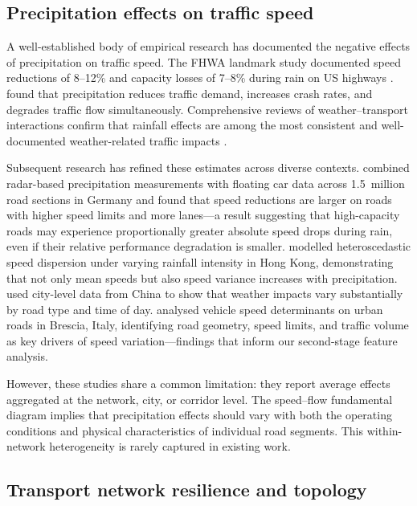 \documentclass[review]{elsarticle}
\begin{document}
\subsection{Precipitation effects on traffic speed}
\label{sec:lit:precip}

A well-established body of empirical research has documented the negative effects of precipitation on traffic speed. The FHWA landmark study documented speed reductions of 8--12\% and capacity losses of 7--8\% during rain on US highways \citep{hranac2006empirical}. \citet{maze2006weather} found that precipitation reduces traffic demand, increases crash rates, and degrades traffic flow simultaneously. Comprehensive reviews of weather--transport interactions confirm that rainfall effects are among the most consistent and well-documented weather-related traffic impacts \citep{koetse2009impact,elfaouzi2012effects}.

Subsequent research has refined these estimates across diverse contexts. \citet{becker2026rainfall} combined radar-based precipitation measurements with floating car data across 1.5~million road sections in Germany and found that speed reductions are larger on roads with higher speed limits and more lanes---a result suggesting that high-capacity roads may experience proportionally greater absolute speed drops during rain, even if their relative performance degradation is smaller. \citet{cai2016rainfall} modelled heteroscedastic speed dispersion under varying rainfall intensity in Hong Kong, demonstrating that not only mean speeds but also speed variance increases with precipitation. \citet{bi2022weather} used city-level data from China to show that weather impacts vary substantially by road type and time of day. \citet{raccagni2024urban} analysed vehicle speed determinants on urban roads in Brescia, Italy, identifying road geometry, speed limits, and traffic volume as key drivers of speed variation---findings that inform our second-stage feature analysis.

However, these studies share a common limitation: they report average effects aggregated at the network, city, or corridor level. The speed--flow fundamental diagram \citep{greenshields1935study} implies that precipitation effects should vary with both the operating conditions and physical characteristics of individual road segments. This within-network heterogeneity is rarely captured in existing work.

\subsection{Transport network resilience and topology}
\label{sec:lit:resilience}
\end{document}
